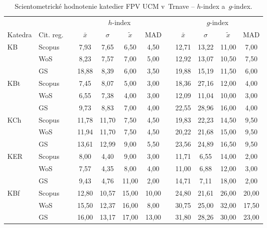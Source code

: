 \begin{table}
  \centering\small
  \caption[Hodnotenie FPV -- $h$-index a $g$-index]%
  {Scientometrické hodnotenie katedier FPV UCM v~Trnave -- $h$-index a~$g$-index.}
  \label{tab:3-staff.results}
  \begin{tabularx}{\textwidth}{XXp{1ex}ccccp{1ex}cccc}
    \toprule
    & & & \multicolumn{4}{c}{$h$-index} & & \multicolumn{4}{c}{$g$-index} \\
    \cmidrule{4-7}\cmidrule{9-12}
    Katedra & Cit. reg. & & $\bar{x}$ & $\sigma$ & $\tilde{x}$ & MAD & & $\bar{x}$ & $\sigma$ & $\tilde{x}$ & MAD \\
    \midrule
    KB   & Scopus & & 7,93  & 7,65  & 6,50  & 4,50  & & 12,71 & 13,22 & 11,00 & 7,00  \\
         & WoS    & & 8,23  & 7,57  & 7,00  & 5,00  & & 12,92 & 13,07 & 10,50 & 7,50  \\
         & GS     & & 18,88 & 8,39  & 6,00  & 3,50  & & 19,88 & 15,19 & 11,50 & 6,00  \\[1ex]
    KBt  & Scopus & & 7,45  & 8,07  & 5,00  & 3,00  & & 18,36 & 27,16 & 12,00 & 4,00  \\
         & WoS    & & 6,55  & 7,38  & 4,00  & 3,00  & & 12,09 & 11,04 & 10,00 & 3,00  \\
         & GS     & & 9,73  & 8,83  & 7,00  & 4,00  & & 22,55 & 28,96 & 16,00 & 4,00  \\[1ex]
    KCh  & Scopus & & 11,78 & 11,70 & 7,50  & 4,50  & & 19,83 & 22,23 & 14,50 & 9,50  \\
         & WoS    & & 11,94 & 11,70 & 7,50  & 4,50  & & 20,22 & 21,68 & 15,00 & 9,50  \\
         & GS     & & 13,61 & 12,99 & 9,00  & 5,50  & & 23,56 & 24,89 & 16,50 & 9,50  \\[1ex]
    KER  & Scopus & & 8,00  & 4,40  & 9,00  & 3,00  & & 11,71 & 6,55  & 14,00 & 2,00  \\
         & WoS    & & 7,57  & 4,35  & 8,00  & 4,00  & & 11,00 & 6,88  & 12,00 & 3,00  \\
         & GS     & & 9,43  & 4,76  & 11,00 & 2,00  & & 14,71 & 7,11  & 18,00 & 2,00  \\[1ex]
    KBf  & Scopus & & 12,80 & 10,57 & 15,00 & 10,00 & & 24,80 & 21,61 & 26,00 & 20,00 \\
         & WoS    & & 15,50 & 12,37 & 16,00 & 8,00  & & 30,75 & 25,00 & 32,00 & 17,50 \\
         & GS     & & 16,00 & 13,17 & 17,00 & 13,00 & & 31,80 & 28,26 & 30,00 & 23,00 \\[1ex]

\end{tabularx}
\end{table}
